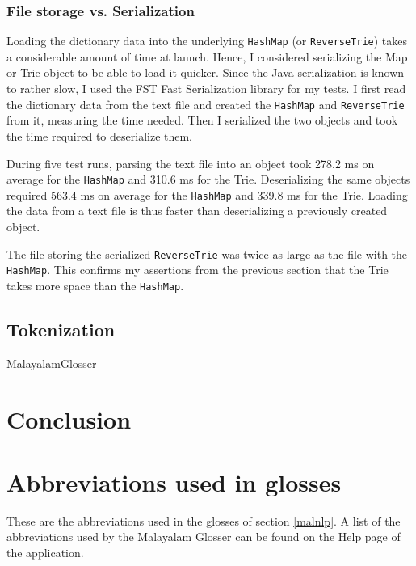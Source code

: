 \documentclass[a4paper]{article}
\newcommand{\typ}[1]{\texttt{#1}}
\begin{document}
\subsubsection*{File storage vs. Serialization}

Loading the dictionary data into the underlying \typ{HashMap} (or \typ{ReverseTrie}) takes a considerable amount of time at launch. Hence, I considered serializing the Map or Trie object to be able to load it quicker. Since the Java serialization is known to rather slow, I used the FST Fast Serialization library for my tests. I first read the dictionary data from the text file and created the \typ{HashMap} and \typ{ReverseTrie} from it, measuring the time needed. Then I serialized the two objects and took the time required to deserialize them.

During five test runs, parsing the text file into an object took 278.2 ms on average for the \typ{HashMap} and 310.6 ms for the Trie. Deserializing the same objects required 563.4 ms on average for the \typ{HashMap} and 339.8 ms for the Trie. Loading the data from a text file is thus faster than deserializing a previously created object.

The file storing the serialized \typ{ReverseTrie} was twice as large as the file with the \typ{HashMap}. This confirms my assertions from the previous section that the Trie takes more space than the \typ{HashMap}.


\subsection{Tokenization}

MalayalamGlosser

\section{Conclusion}

\printbibliography
\clearpage

\appendix

\section{Abbreviations used in glosses}

These are the abbreviations used in the glosses of section \ref{malnlp}. A list of the abbreviations used by the Malayalam Glosser can be found on the Help page of the application.
\end{document}
